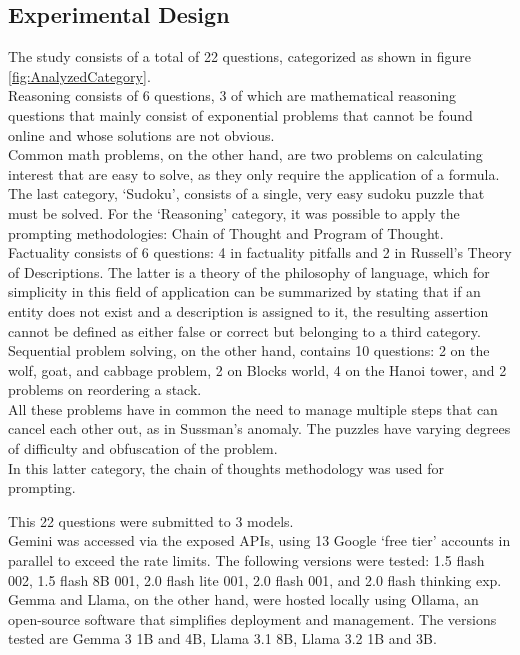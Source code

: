\documentclass[12pt]{article}
\begin{document}
    
    \subsection{Experimental Design} 
    The study consists of a total of 22 questions, categorized as shown in figure \ref{fig:AnalyzedCategory}.\\
Reasoning consists of 6 questions, 3 of which are mathematical reasoning questions that mainly consist of exponential problems that cannot be found online and whose solutions are not obvious.\\
Common math problems, on the other hand, are two problems on calculating interest that are easy to solve, as they only require the application of a formula.\\
The last category, ‘Sudoku’, consists of a single, very easy sudoku puzzle that must be solved.
For the ‘Reasoning’ category, it was possible to apply the prompting methodologies: Chain of Thought and Program of Thought.\\
Factuality consists of 6 questions: 4 in factuality pitfalls and 2 in Russell's Theory of Descriptions. The latter is a theory of the philosophy of language, which for simplicity in this field of application can be summarized by stating that if an entity does not exist and a description is assigned to it, the resulting assertion cannot be defined as either false or correct but belonging to a third category.\\
Sequential problem solving, on the other hand, contains 10 questions: 2 on the wolf, goat, and cabbage problem, 2 on Blocks world, 4 on the Hanoi tower, and 2 problems on reordering a stack.\\
All these problems have in common the need to manage multiple steps that can cancel each other out, as in Sussman's anomaly. The puzzles have varying degrees of difficulty and obfuscation of the problem.\\
In this latter category, the chain of thoughts methodology was used for prompting.
    
    This 22 questions were submitted to 3 models. \\
Gemini was accessed via the exposed APIs, using 13 Google ‘free tier’ accounts in parallel to exceed the rate limits. The following versions were tested: 1.5 flash 002, 1.5 flash 8B 001, 2.0 flash lite 001, 2.0 flash 001, and 2.0 flash thinking exp.\\
Gemma and Llama, on the other hand, were hosted locally using Ollama, an open-source software that simplifies deployment and management. The versions tested are Gemma 3 1B and 4B, Llama 3.1 8B, Llama 3.2 1B and 3B.
\end{document}
